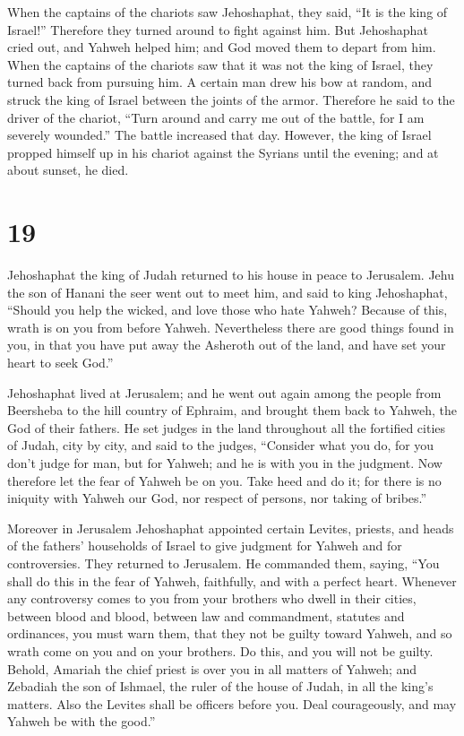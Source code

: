  When the captains of the chariots saw Jehoshaphat, they
said, ``It is the king of Israel!'' Therefore they turned around to
fight against him. But Jehoshaphat cried out, and Yahweh helped him; and
God moved them to depart from him.  When the captains of
the chariots saw that it was not the king of Israel, they turned back
from pursuing him.  A certain man drew his bow at random,
and struck the king of Israel between the joints of the armor. Therefore
he said to the driver of the chariot, ``Turn around and carry me out of
the battle, for I am severely wounded.''  The battle
increased that day. However, the king of Israel propped himself up in
his chariot against the Syrians until the evening; and at about sunset,
he died.

\hypertarget{section-18}{%
\section{19}\label{section-18}}

 Jehoshaphat the king of Judah returned to his house in
peace to Jerusalem.  Jehu the son of Hanani the seer went
out to meet him, and said to king Jehoshaphat, ``Should you help the
wicked, and love those who hate Yahweh? Because of this, wrath is on you
from before Yahweh.  Nevertheless there are good things
found in you, in that you have put away the Asheroth out of the land,
and have set your heart to seek God.''

 Jehoshaphat lived at Jerusalem; and he went out again
among the people from Beersheba to the hill country of Ephraim, and
brought them back to Yahweh, the God of their fathers.  He
set judges in the land throughout all the fortified cities of Judah,
city by city,  and said to the judges, ``Consider what you
do, for you don't judge for man, but for Yahweh; and he is with you in
the judgment.  Now therefore let the fear of Yahweh be on
you. Take heed and do it; for there is no iniquity with Yahweh our God,
nor respect of persons, nor taking of bribes.''

 Moreover in Jerusalem Jehoshaphat appointed certain
Levites, priests, and heads of the fathers' households of Israel to give
judgment for Yahweh and for controversies. They returned to Jerusalem.
 He commanded them, saying, ``You shall do this in the
fear of Yahweh, faithfully, and with a perfect heart. 
Whenever any controversy comes to you from your brothers who dwell in
their cities, between blood and blood, between law and commandment,
statutes and ordinances, you must warn them, that they not be guilty
toward Yahweh, and so wrath come on you and on your brothers. Do this,
and you will not be guilty.  Behold, Amariah the chief
priest is over you in all matters of Yahweh; and Zebadiah the son of
Ishmael, the ruler of the house of Judah, in all the king's matters.
Also the Levites shall be officers before you. Deal courageously, and
may Yahweh be with the good.''


